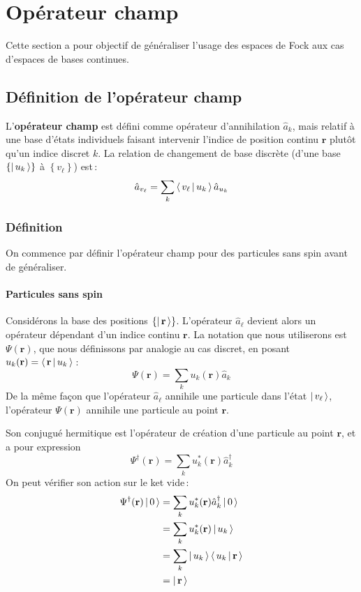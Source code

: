 \section{Opérateur champ}

    Cette section a pour objectif de généraliser l’usage des espaces de Fock aux cas d’espaces de bases continues.

    \subsection{Définition de l’opérateur champ}

    L’\textbf{opérateur champ} est défini comme opérateur d’annihilation $\hat{a}_{k}$, mais relatif à une base d’états individuels faisant intervenir l’indice de position continu $\mathbf{r}$ plutôt qu’un indice discret $k$. La relation de changement de base discrète (d’une base $\left\{\left| \, u_k \, \right>\right\}$ à $\left\{v_{\ell}\right\}$) est :
    \[ \hat{a}_{v_{\ell}} = \sum_{k} \left< \, v_{\ell} \, \middle| \, u_k \, \right> \hat{a}_{u_k} \]   

        \subsubsection{Définition}

        On commence par définir l’opérateur champ pour des particules sans spin avant de généraliser.

            \paragraph{Particules sans spin}

            Considérons la base des positions $\left\{\left| \, \mathbf{r} \, \right>\right\}$. L’opérateur $\hat{a}_{\ell}$ devient alors un opérateur dépendant d’un indice continu $\mathbf{r}$. La notation que nous utiliserons est $\Psi(\mathbf{r})$, que nous définissons par analogie au cas discret, en posant $u_k(\mathbf{r}) = \left< \, \mathbf{r} \, \middle| \, u_k \, \right>$ :
            \[ \Psi(\mathbf{r}) = \sum_{k} u_k(\mathbf{r}) \hat{a}_{k} \]
            De la même façon que l’opérateur $\hat{a}_{\ell}$ annihile une particule dans l’état $\left| \, v_{\ell} \, \right>$, l’opérateur $\Psi(\mathbf{r})$ annihile une particule au point $\mathbf{r}$. 

            Son conjugué hermitique est l’opérateur de création d’une particule au point $\mathbf{r}$, et a pour expression 
            \[ \Psi^{\dagger}(\mathbf{r}) = \sum_{k} u_k^*(\mathbf{r}) \hat{a}_k^{\dagger} \]   
            On peut vérifier son action sur le ket vide :
            \begin{align*}
                \Psi^{\dagger}(\mathbf{r})\left| \, 0 \, \right> 
                &=  \sum_{k} u_k^*(\mathbf{r}) \hat{a}_k^{\dagger} \left| \, 0 \, \right> \\
                &=  \sum_{k} u_k^*(\mathbf{r}) \left| \, u_k \, \right> \\
                &=  \sum_{k} \left| \, u_k \, \right> \left< \, u_k \, \middle| \, \mathbf{r} \, \right> \\
                &= \left| \, \mathbf{r} \, \right>
            \end{align*}

